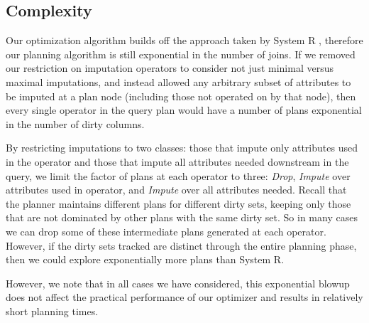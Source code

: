 \subsection{Complexity}\label{sec:complexity}
Our optimization algorithm builds off the approach taken by System R \cite{blasgen1981system}, therefore our planning algorithm is still exponential in the number of joins. 
If we removed our restriction on imputation operators to consider not just minimal versus maximal imputations, and instead allowed any arbitrary subset
of attributes to be imputed at a plan node (including those not operated on by that node), then every single operator in the query plan would have a
number of plans exponential in the number of dirty columns.

By restricting imputations to two classes: those that impute only attributes used in the operator and those that impute all attributes needed downstream in the query,
we limit the factor of plans at each operator to three: \textit{Drop}, \textit{Impute} over attributes used in operator, and \textit{Impute} over all attributes needed.
Recall that the planner maintains different plans for different dirty sets, keeping only those that are not dominated by other plans with the same dirty set. So in many
cases we can drop some of these intermediate plans generated at each operator. However, if the dirty sets tracked are distinct through the entire planning phase,
then we could explore exponentially more plans than System R.

However, we note that in all cases we have considered, this exponential blowup does not affect the practical performance of our optimizer and results in relatively short
planning times.

